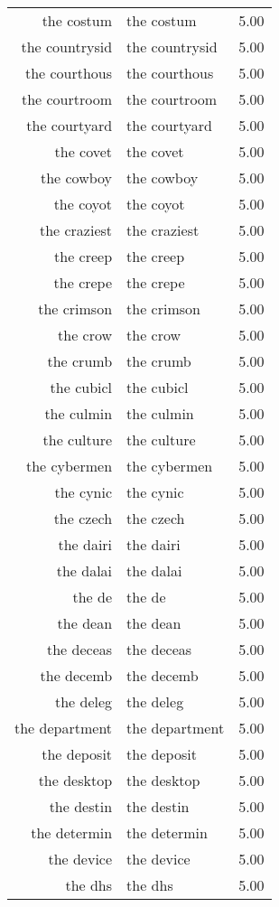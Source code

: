 \begin{table}[ht]
\begin{tabular}{rlr}
  the costum & the costum & 5.00 \\ 
  the countrysid & the countrysid & 5.00 \\ 
  the courthous & the courthous & 5.00 \\ 
  the courtroom & the courtroom & 5.00 \\ 
  the courtyard & the courtyard & 5.00 \\ 
  the covet & the covet & 5.00 \\ 
  the cowboy & the cowboy & 5.00 \\ 
  the coyot & the coyot & 5.00 \\ 
  the craziest & the craziest & 5.00 \\ 
  the creep & the creep & 5.00 \\ 
  the crepe & the crepe & 5.00 \\ 
  the crimson & the crimson & 5.00 \\ 
  the crow & the crow & 5.00 \\ 
  the crumb & the crumb & 5.00 \\ 
  the cubicl & the cubicl & 5.00 \\ 
  the culmin & the culmin & 5.00 \\ 
  the culture & the culture & 5.00 \\ 
  the cybermen & the cybermen & 5.00 \\ 
  the cynic & the cynic & 5.00 \\ 
  the czech & the czech & 5.00 \\ 
  the dairi & the dairi & 5.00 \\ 
  the dalai & the dalai & 5.00 \\ 
  the de & the de & 5.00 \\ 
  the dean & the dean & 5.00 \\ 
  the deceas & the deceas & 5.00 \\ 
  the decemb & the decemb & 5.00 \\ 
  the deleg & the deleg & 5.00 \\ 
  the department & the department & 5.00 \\ 
  the deposit & the deposit & 5.00 \\ 
  the desktop & the desktop & 5.00 \\ 
  the destin & the destin & 5.00 \\ 
  the determin & the determin & 5.00 \\ 
  the device & the device & 5.00 \\ 
  the dhs & the dhs & 5.00 \\ 

\end{tabular}
\end{table}
